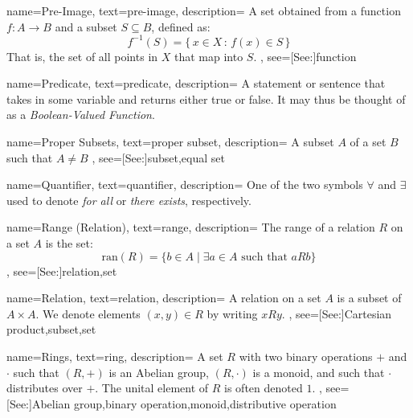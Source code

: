 {
    name={Pre-Image},
    text={pre-image},
    description={
        A set obtained from a function $f:A\rightarrow{B}$
        and a subset $S\subseteq{B}$, defined as:
        \begin{equation*}
            f^{\minus{1}}(S)=\{\,x\in{X}\,:\,f(x)\in{S}\,\}
        \end{equation*}
        That is, the set of all points in $X$ that map into $S$.
    },
    see=[See:]{function}
}

{
    name={Predicate},
    text={predicate},
    description={
        A statement or sentence that takes in some variable and returns either
        true or false. It may thus be thought of as a
        \textit{Boolean-Valued Function}.
    }
}

{
    name={Proper Subsets},
    text={proper subset},
    description={
        A subset $A$ of a set $B$ such that $A\ne{B}$
    },
    see=[See:]{subset,equal set}
}

{
    name={Quantifier},
    text={quantifier},
    description={
        One of the two symbols $\forall$ and $\exists$ used to denote
        \textit{for all} or \textit{there exists}, respectively.
    }
}

{
    name={Range (Relation)},
    text={range},
    description={
        The range of a relation $R$ on a set $A$ is the set:
        \begin{equation*}
            \textrm{ran}(R)=\big\{b\in{A}\;|\;\exists{a}\in{A}
                \textrm{ such that }aRb\big\}
        \end{equation*}
    },
    see=[See:]{relation,set}
}

{
    name={Relation},
    text={relation},
    description={
        A relation on a set $A$ is a subset of $A\times{A}$. We denote elements
        $(x,y)\in{R}$ by writing $xRy$.
    },
    see=[See:]{Cartesian product,subset,set}
}

{
    name={Rings},
    text={ring},
    description={
        A set $R$ with two binary operations $+$ and $\cdot$ such
        that $(R,+)$ is an Abelian group, $(R,\cdot)$ is a monoid,
        and such that $\cdot$ distributes over $+$.
        The unital element of $R$ is often denoted $1$.
    },
    see=[See:]{Abelian group,binary operation,monoid,distributive operation}
}


